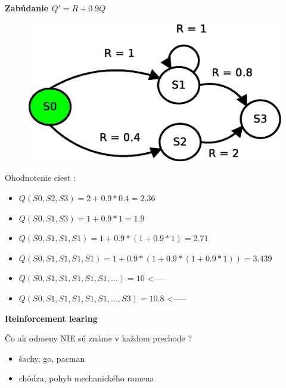 \documentclass[xcolor=dvipsnames]{beamer}
\begin{document}
\begin{frame}{\bf Zabúdanie   $Q' = R + 0.9Q$}

  \begin{figure}[!htb]
  \centering
  \includegraphics[scale=.5]{../diagrams/rf_cycle_states.eps}
  \end{figure}

  Ohodnotenie ciest :
  \begin{itemize}
    \item $Q(S0, S2, S3) = 2 + 0.9*0.4 = 2.36$
    \item $Q(S0, S1, S3) = 1 + 0.9*1 = 1.9$
    \item $Q(S0, S1, S1, S1) = 1 + 0.9*(1 + 0.9*1) = 2.71 $
    \item $Q(S0, S1, S1, S1, S1) = 1 + 0.9*(1 + 0.9*(1 + 0.9*1)) = 3.439$
    \item $Q(S0, S1, S1, S1, S1, S1, ...) = 10$ <-----
    \item $Q(S0, S1, S1, S1, S1, S1, ..., S3) = 10.8$ <-----
  \end{itemize}

\end{frame}

\begin{frame}{\bf Reinforcement learing}

Čo ak odmeny NIE sú známe v každom prechode ?

\begin{itemize}
  \item šachy, go, pacman
  \item chôdza, pohyb mechanického ramena
\end{itemize}

\end{frame}
\end{document}
